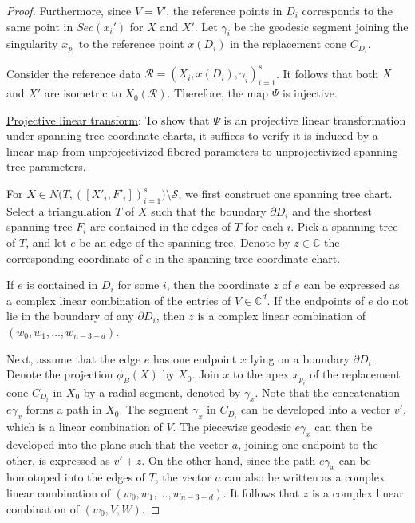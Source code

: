 \documentclass{compositio}
\numberwithin{equation}{section}
\numberwithin{figure}{section}
\theoremstyle{definition}
\theoremstyle{plain}
\begin{document}
{\begin{proof}
Furthermore, since $V=V'$, the reference points in $D_i$ corresponds to the same point in $Sec(x_i')$ for $X$ and $X'$. Let $\gamma_i$ be the geodesic segment joining the singularity $x_{p_i}$ to the reference point $x(D_i)$ in the replacement cone $C_{D_i}$.

Consider the reference data $\mathcal{R} = (X_i, x(D_i), \gamma_i)_{i=1}^s$. It follows that both $X$ and $X'$ are isometric to $X_0(\mathcal{R})$. Therefore, the map $\Psi$ is injective.\newline

\noindent\underline{Projective linear transform}:
To show that $\Psi$ is an projective linear transformation under spanning tree coordinate charts, it suffices to verify it is induced by a linear map from unprojectivized fibered parameters to unprojectivized spanning tree parameters. 

For $X \in N\big(T, ([X'_i, F'_i])_{i=1}^s\big) \setminus \mathcal{S}$, we first construct one spanning tree chart. Select a triangulation $T$ of $X$ such that the boundary $\partial D_i$ and the shortest spanning tree $F_i$ are contained in the edges of $T$ for each $i$. Pick a spanning tree of $T$, and let $e$ be an edge of the spanning tree. Denote by $z \in \mathbb{C}$ the corresponding coordinate of $e$ in the spanning tree coordinate chart.

If $e$ is contained in $D_i$ for some $i$, then the coordinate $z$ of $e$ can be expressed as a complex linear combination of the entries of $V \in \mathbb{C}^d$. If the endpoints of $e$ do not lie in the boundary of any $\partial D_i$, then $z$ is a complex linear combination of $(w_0, w_1, \ldots, w_{n-3-d})$.

Next, assume that the edge $e$ has one endpoint $x$ lying on a boundary $\partial D_i$. Denote the projection $\phi_B(X)$ by $X_0$. Join $x$ to the apex $x_{p_i}$ of the replacement cone $C_{D_i}$ in $X_0$ by a radial segment, denoted by $\gamma_x$. Note that the concatenation $e\gamma_x$ forms a path in $X_0$. The segment $\gamma_x$ in $C_{D_i}$ can be developed into a vector $v'$, which is a linear combination of $V$. The piecewise geodesic $e\gamma_x$ can then be developed into the plane such that the vector $a$, joining one endpoint to the other, is expressed as $v' + z$. On the other hand, since the path $e\gamma_x$ can be homotoped into the edges of $T$, the vector $a$ can also be written as a complex linear combination of $(w_0, w_1, \ldots, w_{n-3-d})$. It follows that $z$ is a complex linear combination of $(w_0, V, W)$.


\end{proof}}
\end{document}
